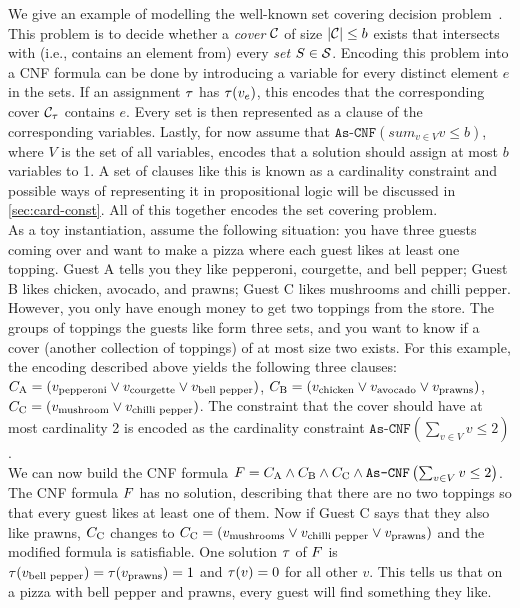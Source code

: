 \begin{example}\label{ex:sat-modelling}
  We give an example of modelling the well-known set covering decision problem~\autocite{DBLP:conf/coco/Karp72}.
  This problem is to decide whether a \emph{cover} $\mathcal{C}$ of size $|\mathcal{C}|\le b$ exists that intersects with (i.e., contains an element from) every \emph{set} $S \in \mathcal{S}$.
  Encoding this problem into a CNF formula can be done by introducing a variable for every distinct element $e$ in the sets.
  If an assignment $\tau$ has $\tau(v_e)$, this encodes that the corresponding cover $\mathcal{C}_\tau$ contains $e$.
  Every set is then represented as a clause of the corresponding variables.
  Lastly, for now assume that $\texttt{As-CNF}\left(sum_{v \in V} v \le b\right)$, where $V$ is the set of all variables, encodes that a solution should assign at most $b$ variables to 1.
  A set of clauses like this is known as a cardinality constraint and possible ways of representing it in propositional logic will be discussed in \cref{sec:card-const}.
  All of this together encodes the set covering problem. \\
  As a toy instantiation, assume the following situation:
  you have three guests coming over and want to make a pizza where each guest likes at least one topping.
  Guest A tells you they like pepperoni, courgette, and bell pepper;
  Guest B likes chicken, avocado, and prawns;
  Guest C likes mushrooms and chilli pepper.
  However, you only have enough money to get two toppings from the store.
  The groups of toppings the guests like form three sets, and you want to know if a cover (another collection of toppings) of at most size two exists.
  For this example, the encoding described above yields the following three clauses:
  $C_\text{A} = (v_\text{pepperoni} \lor v_\text{courgette} \lor v_\text{bell pepper})$, $C_\text{B} = (v_\text{chicken} \lor v_\text{avocado} \lor v_\text{prawns})$, $C_\text{C} = (v_\text{mushroom} \lor v_\text{chilli pepper})$.
  The constraint that the cover should have at most cardinality 2 is encoded as the cardinality constraint $\texttt{As-CNF}\left(\sum_{v \in V} v \le 2\right)$. \\
  We can now build the CNF formula $F = C_\text{A} \allowbreak \land C_\text{B} \allowbreak \land C_\text{C} \allowbreak \land \texttt{As-CNF}\left(\sum_{v \in V} v \le 2\right)$.
  The CNF formula $F$ has no solution, describing that there are no two toppings so that every guest likes at least one of them.
  Now if Guest C says that they also like prawns, $C_\text{C}$ changes to $C_\text{C} = (v_\text{mushrooms} \lor v_\text{chilli pepper} \lor v_\text{prawns})$ and the modified formula is satisfiable.
  One solution $\tau$ of $F$ is $\tau(v_\text{bell pepper}) = \tau(v_\text{prawns}) = 1$ and $\tau(v) = 0$ for all other $v$.
  This tells us that on a pizza with bell pepper and prawns, every guest will find something they like.
\end{example}

